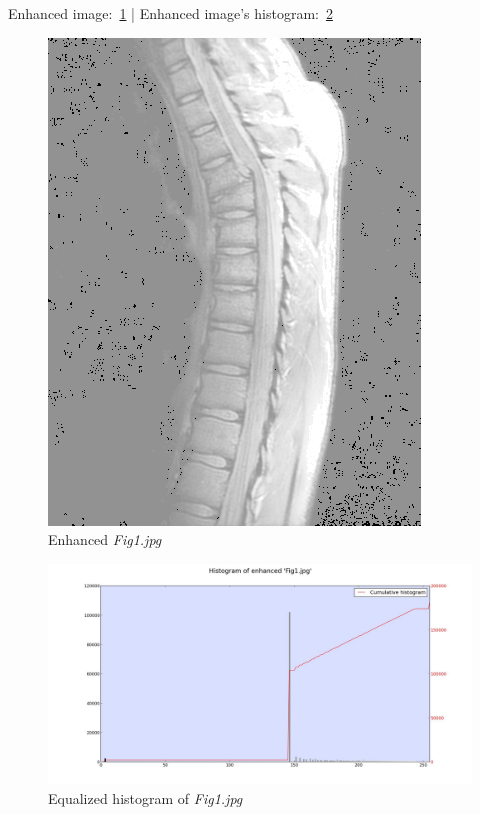     Enhanced image:~\ref{diagram:enhanced_fig1} |
    Enhanced image's histogram:~\ref{diagram:equal_hist_fig1}

    \begin{figure}[!htb]\centering
        \includegraphics[width=0.7\linewidth]{./images/1/Enhanced_Fig1.jpg}
        \caption{Enhanced \textit{Fig1.jpg}}\label{diagram:enhanced_fig1}
    \end{figure}

    \begin{figure}[!htb]\centering
        \includegraphics[width=\linewidth]{./images/1/Equalized_Histogram_Fig1.jpg}
        \caption{Equalized histogram of \textit{Fig1.jpg}}\label{diagram:equal_hist_fig1}
    \end{figure}


